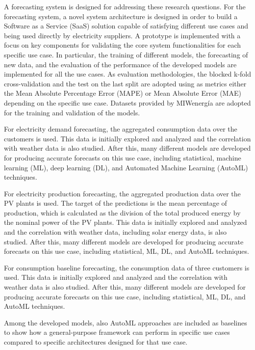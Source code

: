 A forecasting system is designed for addressing these research questions.
For the forecasting system, a novel system architecture is designed in order to build a Software as a Service (SaaS) solution capable of satisfying different use cases and being used directly by electricity suppliers.
A prototype is implemented with a focus on key components for validating the core system functionalities for each specific use case.
In particular, the training of different models, the forecasting of new data, and the evaluation of the performance of the developed models are implemented for all the use cases.
As evaluation methodologies, the blocked k-fold cross-validation and the test on the last split are adopted using as metrics either the Mean Absolute Percentage Error (MAPE) or Mean Absolute Error (MAE) depending on the specific use case.
Datasets provided by MIWenergía are adopted for the training and validation of the models.

For electricity demand forecasting, the aggregated consumption data over the customers is used.
This data is initially explored and analyzed and the correlation with weather data is also studied.
After this, many different models are developed for producing accurate forecasts on this use case, including statistical, machine learning (ML), deep learning (DL), and Automated Machine Learning (AutoML) techniques.

For electricity production forecasting, the aggregated production data over the PV plants is used.
The target of the predictions is the mean percentage of production, which is calculated as the division of the total produced energy by the nominal power of the PV plants.
This data is initially explored and analyzed and the correlation with weather data, including solar energy data, is also studied.
After this, many different models are developed for producing accurate forecasts on this use case, including statistical, ML, DL, and AutoML techniques.

For consumption baseline forecasting, the consumption data of three customers is used.
This data is initially explored and analyzed and the correlation with weather data is also studied.
After this, many different models are developed for producing accurate forecasts on this use case, including statistical, ML, DL, and AutoML techniques.

Among the developed models, also AutoML approaches are included as baselines to show how a general-purpose framework can perform in specific use cases compared to specific architectures designed for that use case.

